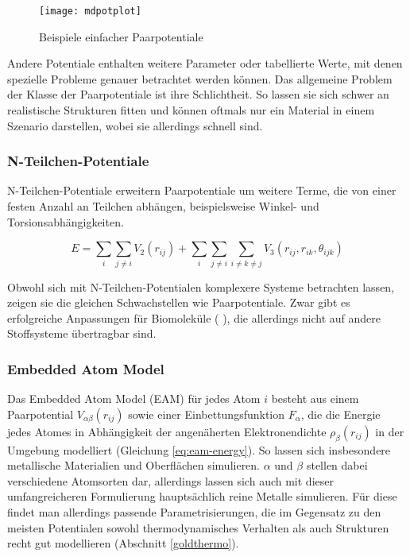 \begin{figure}
  \centering
  \texttt{[image: mdpotplot]}
  \caption{Beispiele einfacher Paarpotentiale}
  \label{fig:mdpairpotentials}
\end{figure}

Andere Potentiale enthalten weitere Parameter oder tabellierte Werte, mit denen spezielle Probleme genauer betrachtet werden können.
Das allgemeine Problem der Klasse der Paarpotentiale ist ihre Schlichtheit.
So lassen sie sich schwer an realistische Strukturen fitten und können oftmals nur ein Material in einem Szenario darstellen, wobei sie allerdings schnell sind.

\subsubsection{N-Teilchen-Potentiale}

N-Teilchen-Potentiale  erweitern Paarpotentiale um weitere Terme, die von einer festen Anzahl an Teilchen abhängen, beispielsweise Winkel- und Torsionsabhängigkeiten.

\begin{equation}
  \label{eq:nbody-energy}
  E = \sum_i\sum_{j \neq i}{V_2\left(r_{ij}\right)} + \sum_i\sum_{j \neq i}\sum_{i \neq k \neq j}{V_3\left(r_{ij}, r_{ik}, \theta_{ijk}\right)}
\end{equation}

Obwohl sich mit N-Teilchen-Potentialen komplexere Systeme betrachten lassen, zeigen sie die gleichen Schwachstellen wie Paarpotentiale.
Zwar gibt es erfolgreiche  Anpassungen für Biomoleküle (  ), die allerdings nicht auf andere Stoffsysteme übertragbar sind.

\subsubsection{Embedded Atom Model}

Das Embedded Atom Model (EAM) für jedes Atom $i$ besteht aus einem Paarpotential $V_{\alpha\beta}(r_{ij})$ sowie einer Einbettungsfunktion $F_\alpha$, die die Energie jedes Atomes in Abhängigkeit der angenäherten Elektronendichte $\rho_\beta(r_{ij})$ in der Umgebung modelliert (Gleichung \ref{eq:eam-energy}).
So lassen sich insbesondere metallische Materialien und Oberflächen simulieren.
$\alpha$ und $\beta$ stellen dabei verschiedene Atomsorten dar, allerdings lassen sich auch mit dieser umfangreicheren Formulierung hauptsächlich reine Metalle simulieren.
Für diese findet man allerdings passende Parametrisierungen, die im Gegensatz zu den meisten Potentialen sowohl thermodynamisches Verhalten als auch Strukturen recht gut modellieren (Abschnitt \ref{goldthermo}).

